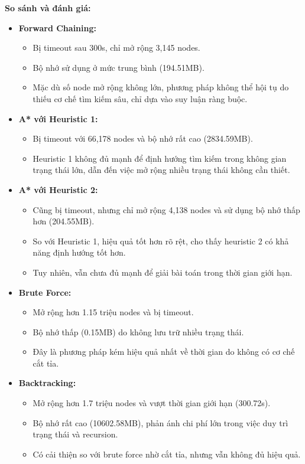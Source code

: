 \textbf{So sánh và đánh giá:}
\begin{itemize}
\item \textbf{Forward Chaining:}
\begin{itemize}
    \item Bị timeout sau 300s, chỉ mở rộng 3,145 nodes.
    \item Bộ nhớ sử dụng ở mức trung bình (194.51MB).
    \item Mặc dù số node mở rộng không lớn, phương pháp không thể hội tụ do thiếu cơ chế tìm kiếm sâu, chỉ dựa vào suy luận ràng buộc.
\end{itemize}

\item \textbf{A* với Heuristic 1:}
\begin{itemize}
    \item Bị timeout với 66,178 nodes và bộ nhớ rất cao (2834.59MB).
    \item Heuristic 1 không đủ mạnh để định hướng tìm kiếm trong không gian trạng thái lớn, dẫn đến việc mở rộng nhiều trạng thái không cần thiết.
\end{itemize}

\item \textbf{A* với Heuristic 2:}
\begin{itemize}
    \item Cũng bị timeout, nhưng chỉ mở rộng 4,138 nodes và sử dụng bộ nhớ thấp hơn (204.55MB).
    \item So với Heuristic 1, hiệu quả tốt hơn rõ rệt, cho thấy heuristic 2 có khả năng định hướng tốt hơn.
    \item Tuy nhiên, vẫn chưa đủ mạnh để giải bài toán trong thời gian giới hạn.
\end{itemize}

\item \textbf{Brute Force:}
\begin{itemize}
    \item Mở rộng hơn 1.15 triệu nodes và bị timeout.
    \item Bộ nhớ thấp (0.15MB) do không lưu trữ nhiều trạng thái.
    \item Đây là phương pháp kém hiệu quả nhất về thời gian do không có cơ chế cắt tỉa.
\end{itemize}

\item \textbf{Backtracking:}
\begin{itemize}
    \item Mở rộng hơn 1.7 triệu nodes và vượt thời gian giới hạn (300.72s).
    \item Bộ nhớ rất cao (10602.58MB), phản ánh chi phí lớn trong việc duy trì trạng thái và recursion.
    \item Có cải thiện so với brute force nhờ cắt tỉa, nhưng vẫn không đủ hiệu quả.
\end{itemize}

\end{itemize}

